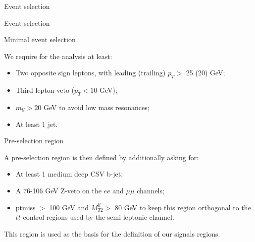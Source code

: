 \documentclass[8pt]{beamer}
\begin{document}
\begin{frame}[standout]
Event selection
\end{frame}

\begin{frame}{Event selection}
\justifying
\vspace{5pt}
\begin{block}{\centering Minimal event selection}\end{block} \vfill
\vspace{-5pt}

We require for the analysis at least:
\begin{itemize}
\item Two opposite sign leptons, with leading (trailing) $p_T >$ 25 (20) GeV;
\item Third lepton veto ($p_T < 10$ GeV);
\item $m_{ll} > 20$ GeV to avoid low mass resonances;
\item At least 1 jet.
\end{itemize} \vfill

\vspace{5pt}
\begin{block}{\centering Pre-selection region}\end{block} \vfill
\vspace{-5pt}

A pre-selection region is then defined by additionally asking for:
\begin{itemize}
\item At least 1 medium deep CSV b-jet;
\item A 76-106 GeV Z-veto on the $ee$ and $\mu \mu$ channels;
\item ptmiss $>$ 100 GeV and $M_{T2}^{ll} >$ 80 GeV to keep this region orthogonal to the $t \bar t$ control regions used by the semi-leptonic channel.
\end{itemize} \vfill

This region is used as the \alert{basis for the definition of our signals regions}. \vfill
\end{frame}
\end{document}
